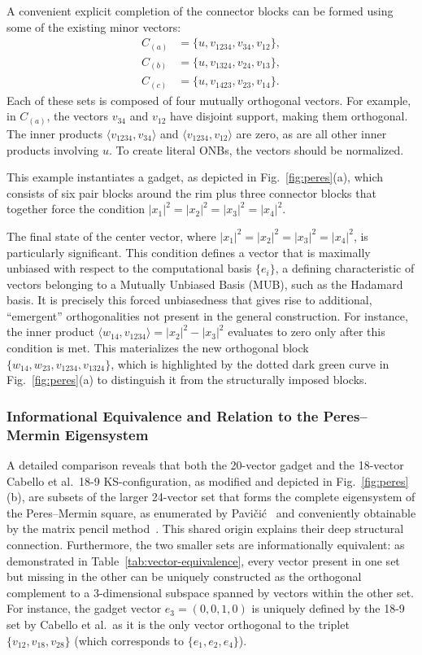 \documentclass[%
  reprint,
  superscriptaddress,
  showpacs,
  showkeys,
  amsmath,amssymb,
  pra,
  longbibliography,
  floatfix,
  x11names
]{revtex4-2}
\begin{document}
A convenient explicit completion of the connector blocks can be formed using some of the existing minor vectors:
\begin{align*}
C_{(a)}&=\{u, v_{1234}, v_{34}, v_{12}\},\\
C_{(b)}&=\{u, v_{1324}, v_{24}, v_{13}\},\\
C_{(c)}&=\{u, v_{1423}, v_{23}, v_{14}\}.
\end{align*}
Each of these sets is composed of four mutually orthogonal vectors. For example, in $C_{(a)}$, the vectors $v_{34}$ and $v_{12}$ have disjoint support,
making them orthogonal. The inner products $\langle v_{1234}, v_{34} \rangle$ and $\langle v_{1234}, v_{12} \rangle$ are zero, as are all other inner products involving $u$. To create literal ONBs, the vectors should be normalized.

This example instantiates a gadget, as depicted in Fig.~\ref{fig:peres}(a), which consists of six pair blocks around the rim plus three
connector blocks that together force the condition $|x_1|^2=|x_2|^2=|x_3|^2=|x_4|^2$.

The final state of the center vector, where $|x_1|^2=|x_2|^2=|x_3|^2=|x_4|^2$, is particularly significant.
This condition defines a vector that is maximally unbiased with respect to the computational basis $\{e_i\}$,
a defining characteristic of vectors belonging to a Mutually Unbiased Basis (MUB), such as the Hadamard basis.
It is precisely this forced unbiasedness that gives rise to additional, ``emergent'' orthogonalities not present in the general construction.
For instance, the inner product $\langle w_{14}, v_{1234} \rangle = |x_2|^2 - |x_3|^2$ evaluates to zero only after this condition is met.
This materializes the new orthogonal block $\{w_{14}, w_{23}, v_{1234}, v_{1324}\}$,
which is highlighted by the dotted dark green curve in Fig.~\ref{fig:peres}(a) to distinguish it from the structurally imposed blocks.


\subsubsection{Informational Equivalence and Relation to the Peres--Mermin Eigensystem}
A detailed comparison reveals that both the 20-vector gadget and the 18-vector Cabello et al.\ 18-9 KS-configuration, as modified and depicted in Fig.~\ref{fig:peres}(b), are subsets of
the larger 24-vector set that forms the complete eigensystem of the Peres--Mermin square,
as enumerated by Pavi\v{c}i\'{c}~\cite{pavicic-2004ksafq}
and  conveniently obtainable by the matrix pencil method~\cite[Table~I]{svozil-2024-convert-pra-externalfigures}.
This shared origin explains their deep structural connection.
Furthermore, the two smaller sets are informationally equivalent: as demonstrated in
Table~\ref{tab:vector-equivalence}, every vector present in one set but missing in the other can be uniquely constructed as the orthogonal complement to a 3-dimensional subspace spanned by vectors within the other set. For instance, the gadget vector $e_3=(0,0,1,0)$ is uniquely defined by the 18-9 set  by Cabello et al.\ as it is the only vector orthogonal to the triplet $\{v_{12}, v_{18}, v_{28}\}$ (which corresponds to $\{e_1, e_2, e_4\}$).
\end{document}

